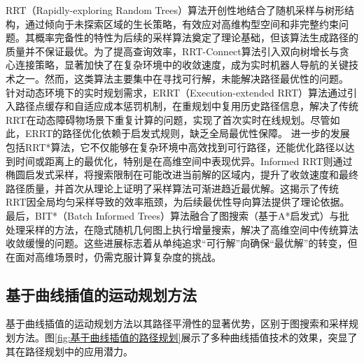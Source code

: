 \documentclass[master,academic]{ysuthesis} %
\begin{document}
		RRT（Rapidly-exploring Random Trees）算法开创性地结合了随机采样与树形结构，通过倾向于未探索区域的生长策略，有效应对高维构型空间和非完整约束问题。其概率完备性的特性为后续的采样算法奠定了理论基础，但该算法生成路径的质量并不保证最优。为了提高查询效率，RRT-Connect算法引入双向树增长与贪心连接策略，显著加快了在复杂环境中的收敛速度，成为实时机器人导航的关键技术之一。然而，这类算法主要集中在寻找可行解，未能解决路径最优性的问题。
		针对动态环境下的实时规划需求，ERRT（Execution-extended RRT）算法通过引入路径点缓存和自适应成本惩罚机制，在重规划中复用历史路径信息，解决了传统RRT在动态障碍物场景下重复计算的问题，实现了首次实时在线规划。尽管如此，ERRT的路径优化依赖于启发式规则，缺乏全局最优性保障。
		进一步的发展包括RRT*算法，它不仅能够在复杂环境中高效找到可行路径，还能优化路径以达到时间或距离上的最优化，特别是在高维空间中表现优异。Informed RRT则通过椭圆启发式采样，将搜索限制在可能改进当前解的区域内，提升了收敛速度和最终路径质量，并首次从理论上证明了采样算法可渐进趋近最优解。这揭示了传统RRT因全局均匀采样导致的效率瓶颈，为后续最优性导向算法提供了理论依据。
		最后，BIT*（Batch Informed Trees）算法融合了图搜索（基于A*启发式）与批处理采样的方法，在隐式随机几何图上执行增量搜索，解决了高维空间中传统算法收敛缓慢的问题。这些进展标志着从单纯追求“可行解”向确保“最优解”的转变，但在面对高维场景时，仍需克服计算复杂度的挑战。

		\subsection{基于曲线插值的运动规划方法}
		基于曲线插值的运动规划方法以其路径平滑性的显著优势，区别于图搜索和采样规划方法。图\ref{fig:基于曲线插值的路径规划}展示了多种曲线插值技术的效果，突显了其在路径规划中的应用潜力。
\end{document}
